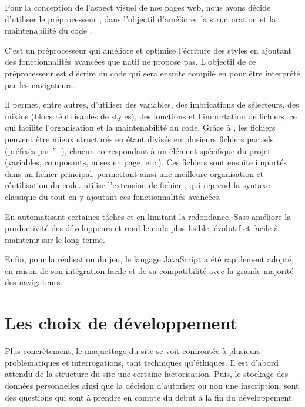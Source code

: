 Pour la conception de l'aspect visuel de nos pages web, nous avons décidé d'utiliser le préprocesseur , dans l'objectif d’améliorer la structuration et la maintenabilité du code .

C'est un préprocesseur  qui améliore et optimise l'écriture des styles en ajoutant des fonctionnalités avancées que  natif ne propose pas.
L'objectif de ce préprocesseur est d'écrire du code  qui sera ensuite compilé en  pour être interprété par les navigateurs.

Il permet, entre autres, d’utiliser des variables, des imbrications de sélecteurs, des mixins (blocs réutilisables de styles), des fonctions et l’importation de fichiers, ce qui facilite l'organisation et la maintenabilité du code.
Grâce à , les fichiers  peuvent être mieux structurés en étant divisés en plusieurs fichiers partiels (préfixés par '\logo{\_}'~), chacun correspondant à un élément spécifique du projet (variables, composants, mises en page, etc.). 
Ces fichiers sont ensuite importés dans un fichier principal, permettant ainsi une meilleure organisation et réutilisation du code.
 utilise l’extension de fichier , qui reprend la syntaxe classique du  tout en y ajoutant ces fonctionnalités avancées.

En automatisant certaines tâches et en limitant la redondance, Sass améliore la productivité des développeurs et rend le code plus lisible, évolutif et facile à maintenir sur le long terme.
\bigskip

Enfin, pour la réalisation du jeu, le langage JavaScript a été rapidement adopté, en raison de son intégration facile et de sa compatibilité avec la grande majorité des navigateurs.




\section{Les choix de développement}  
\label{sec:difficultes}

Plus concrètement, le maquettage du site se voit confrontée à plusieurs problématiques et interrogations, tant techniques qu'éthiques. Il est d'abord attendu de la structure du site une certaine factorisation. Puis, le stockage des données personnelles ainsi que la décision d'autoriser ou non une inscription, sont des questions qui sont à prendre en compte du début à la fin du développement.

